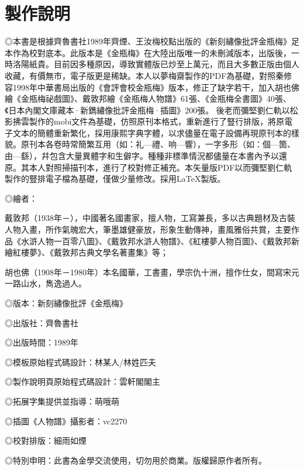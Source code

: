 \chapter*{製作說明}


◎本書是根據齊魯書社1989年齊煙、王汝梅校點出版的《新刻繡像批評金瓶梅》足本作為校對底本。此版本是《金瓶梅》在大陸出版唯一的未刪減版本，出版後，一時洛陽紙貴。目前因多種原因，導致實體版已炒至上萬元，而且大多數正版由個人收藏，有價無市，電子版更是稀缺。本人以夢梅齋製作的PDF為基礎，對照秦修容1998年中華書局出版的《會評會校金瓶梅》版本，修正了缺字若干，加入胡也佛繪《金瓶梅祕戲圖》、戴敦邦繪《金瓶梅人物譜》61張、《金瓶梅全書圖》40張、《日本內閣文庫藏本·新鐫繡像批評金瓶梅·插圖》200張。
後老而彌堅劉仁軌以松影拂雲製作的mobi文件為基礎，仿照原刊本格式，重新進行了豎行排版，將原電子文本的簡體重新繁化，採用康熙字典字體，以求儘量在電子設備再現原刊本的樣貌。原刊本各卷時常簡繁互用（如：礼—禮、响—響），一字多形（如：個—箇、由—繇），幷包含大量異體字和生僻字。種種非標準情況都儘量在本書內予以還原。其本人對照掃描刊本，進行了校對修正補充。本矢量版PDF以而彌堅劉仁軌製作的豎排電子檔為基礎，僅做少量修改。採用{\LaTeX}製版。

◎繪者：

戴敦邦（1938年－），中國著名國畫家，擅人物，工寫兼長，多以古典題材及古裝人物入畫，所作氣魄宏大，筆墨雄健豪放，形象生動傳神，畫風雅俗共賞，主要作品《水滸人物一百零八圖》、《戴敦邦水滸人物譜》、《紅樓夢人物百圖》、《戴敦邦新繪紅樓夢》、《戴敦邦古典文學名著畫集》等；

胡也佛（1908年－1980年）本名國華，工書畫，學宗仇十洲，擅作仕女，間寫宋元一路山水，雋逸過人。

◎版本：新刻繡像批評《金瓶梅》

◎出版社：齊魯書社

◎出版時間：1989年

◎模板原始程式碼設計：林某人/林姓匹夫

◎製作說明頁原始程式碼設計：雲軒閣閣主

◎拓展字集提供並指導：萌哦萌

◎插圖《人物譜》攝影者：vc2270

◎校對排版：細雨如煙

◎特別申明：此書為金學交流使用，切勿用於商業。版權歸原作者所有。

\begin{quotation}
\raggedleft\small\kaishu\color{gray}{庚子歲正月製書於米國山景城}
\end{quotation}

{\insertauthorlogo}